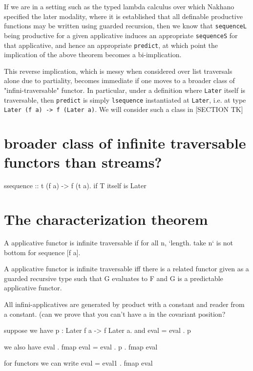 \documentclass[hoptionsi,review,format=sigplan]{acmart}
\newcommand{\hs}{\texttt}
\begin{document}
If we are in a setting such as the typed lambda calculus over which Nakhano specified the later modality, where it is established that all definable productive functions may be written using guarded recursion, then we know that \hs{sequenceL} being productive for a given applicative induces an appropriate \hs{sequenceS} for that applicative, and hence an appropriate \hs{predict}, at which point the implication of the above theorem becomes a bi-implication.

This reverse implication, which is messy when considered over list traversals alone due to partiality, becomes immediate if one moves to a broader class of "infini-traversable" functor. In particular, under a definition where \hs{Later} itself is traversable, then \hs{predict} is simply \hs{lsequence} instantiated at \hs{Later}, i.e. at type \hs{Later (f a) -> f (Later a)}. We will consider such a class in [SECTION TK]



\section{broader class of infinite traversable functors than streams?}

ssequence :: t (f a) -> f (t a). if T itself is Later

\section{The characterization theorem}

A applicative functor is infinite traversable if for all n, `length. take n` is not bottom for sequence [f a]. 

A applicative functor is infinite traversable iff there is a related functor given as a guarded recursive type such that G evaluates to F and G is a predictable applicative functor.


All infini-applicatives are generated by product with a constant and reader from a constant.
(can we prove that you can't have a in the covariant position?

suppose we have p : Later f a -> f Later a. and eval = eval . p

we also have eval . fmap eval = eval . p . fmap eval

for functors we can write eval = eval1 . fmap eval
\end{document}
